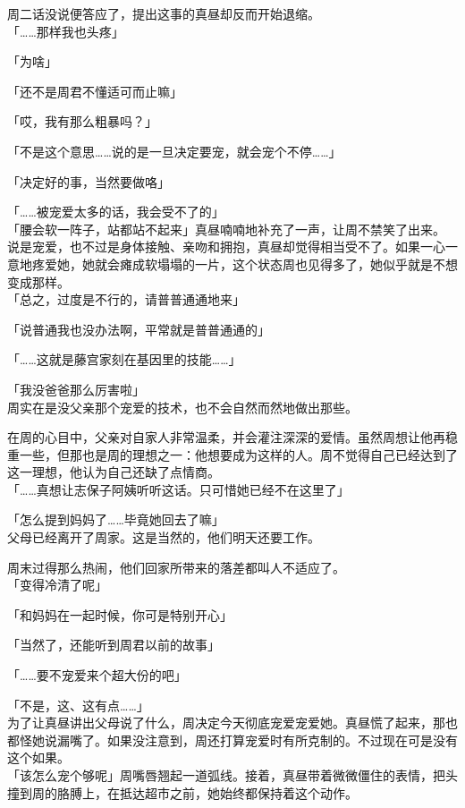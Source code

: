 周二话没说便答应了，提出这事的真昼却反而开始退缩。\\

「……那样我也头疼」

「为啥」

「还不是周君不懂适可而止嘛」

「哎，我有那么粗暴吗？」

「不是这个意思……说的是一旦决定要宠，就会宠个不停……」

「决定好的事，当然要做咯」

「……被宠爱太多的话，我会受不了的」\\

「腰会软一阵子，站都站不起来」真昼喃喃地补充了一声，让周不禁笑了出来。\\

说是宠爱，也不过是身体接触、亲吻和拥抱，真昼却觉得相当受不了。如果一心一意地疼爱她，她就会瘫成软塌塌的一片，这个状态周也见得多了，她似乎就是不想变成那样。\\

「总之，过度是不行的，请普普通通地来」

「说普通我也没办法啊，平常就是普普通通的」

「……这就是藤宫家刻在基因里的技能……」

「我没爸爸那么厉害啦」\\

周实在是没父亲那个宠爱的技术，也不会自然而然地做出那些。

在周的心目中，父亲对自家人非常温柔，并会灌注深深的爱情。虽然周想让他再稳重一些，但那也是周的理想之一：他想要成为这样的人。周不觉得自己已经达到了这一理想，他认为自己还缺了点情商。\\

「……真想让志保子阿姨听听这话。只可惜她已经不在这里了」

「怎么提到妈妈了……毕竟她回去了嘛」\\

父母已经离开了周家。这是当然的，他们明天还要工作。

周末过得那么热闹，他们回家所带来的落差都叫人不适应了。\\

「变得冷清了呢」

「和妈妈在一起时候，你可是特别开心」

「当然了，还能听到周君以前的故事」

「……要不宠爱来个超大份的吧」

「不是，这、这有点……」\\

为了让真昼讲出父母说了什么，周决定今天彻底宠爱宠爱她。真昼慌了起来，那也都怪她说漏嘴了。如果没注意到，周还打算宠爱时有所克制的。不过现在可是没有这个如果。\\

「该怎么宠个够呢」周嘴唇翘起一道弧线。接着，真昼带着微微僵住的表情，把头撞到周的胳膊上，在抵达超市之前，她始终都保持着这个动作。
